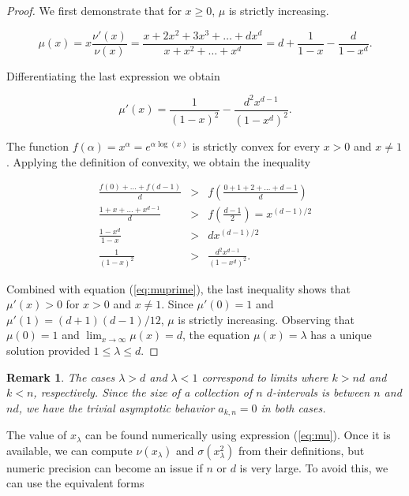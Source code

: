 \documentclass{article}
\newtheorem*{remark}{Remark}
\begin{document}
\begin{proof}
We first demonstrate that for $x \geq 0$, $\mu$ is strictly increasing.

\begin{equation}
\label{eq:mu}
\mu(x) = x\frac{\nu'(x)}{\nu(x)} =
\frac{x+2x^2+3x^3+\ldots+dx^d}{x+x^2+\ldots+x^d} =
d+\frac{1}{1-x} - \frac{d}{1-x^d}.
\end{equation} 

Differentiating the last expression we obtain

\begin{equation}
\label{eq:muprime}
\mu'(x) = \frac{1}{(1-x)^2} -\frac{d^2x^{d-1}}{(1-x^d)^2}.
\end{equation}

The function $f(\alpha) = x^{\alpha} = e^{\alpha \log(x)}$ is strictly
convex for every $x > 0$ and $x \neq 1$. Applying the definition of
convexity, we obtain the inequality

\begin{eqnarray*}
\frac{f(0)+\ldots+f(d-1)}{d} &>&
f\left(\frac{0+1+2+\ldots+d-1}{d}\right) \\
\frac{1+x+\ldots+x^{d-1}}{d} &>& f\left(\frac{d-1}{2}\right)
= x^{(d-1)/2} \\
\frac{1-x^d}{1-x} &>& dx^{(d-1)/2} \\
\frac{1}{(1-x)^2} &>& \frac{d^2x^{d-1}}{(1-x^d)^2}.
\end{eqnarray*}

Combined with equation (\ref{eq:muprime}), the last inequality shows that
$\mu'(x) > 0$ for $x > 0$ and $x \neq 1$. Since $\mu'(0) = 1$ and $\mu'(1)
= (d+1)(d-1)/12$, $\mu$ is strictly increasing. Observing that $\mu(0) =
1$ and $\lim_{x\rightarrow\infty} \mu(x) = d$, the equation $\mu(x) =
\lambda$ has a unique solution provided $1 \leq \lambda \leq d$.
\end{proof}

\begin{remark}
The cases $\lambda > d$ and $\lambda < 1$ correspond to limits where $k >
nd$ and $k < n$, respectively. Since the size of a collection of $n$
$d$-intervals is between $n$ and $nd$, we have the trivial asymptotic
behavior $a_{k,n} = 0$ in both cases.
\end{remark}


The value of $x_\lambda$ can be found numerically using expression
(\ref{eq:mu}).  Once it is available, we can compute $\nu(x_\lambda)$ and
$\sigma(x_\lambda^2)$ from their definitions, but numeric precision can
become an issue if $n$ or $d$ is very large. To avoid this, we can use the
equivalent forms
\end{document}
